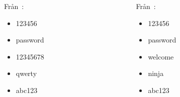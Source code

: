 \documentclass{beamer}
\begin{document}
\begin{frame}
  \begin{example}
    \begin{columns}
      \begin{column}{0.4\textwidth}
        \par
        Från~\cite{Oberheide2010bao}:
        \begin{itemize}
          \item 123456
          \item password
          \item 12345678
          \item qwerty
          \item abc123
        \end{itemize}
      \end{column}
      \begin{column}{0.4\textwidth}
        \par
        Från~\cite{Cluley2012twp}:
        \begin{itemize}
          \item 123456
          \item password
          \item welcome
          \item ninja
          \item abc123
        \end{itemize}
      \end{column}
    \end{columns}
  \end{example}
\end{frame}
\end{document}
